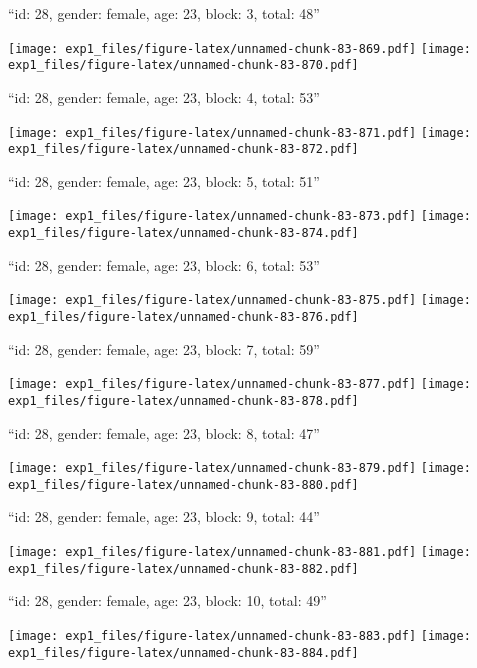\documentclass[11pt,,]{article}
\begin{document}
\newpage
[1] 

``id: 28, gender: female, age: 23, block: 3, total: 48''

\texttt{[image: exp1\_files/figure-latex/unnamed-chunk-83-869.pdf]}
\texttt{[image: exp1\_files/figure-latex/unnamed-chunk-83-870.pdf]}

\newpage
[1] 

``id: 28, gender: female, age: 23, block: 4, total: 53''

\texttt{[image: exp1\_files/figure-latex/unnamed-chunk-83-871.pdf]}
\texttt{[image: exp1\_files/figure-latex/unnamed-chunk-83-872.pdf]}

\newpage
[1] 

``id: 28, gender: female, age: 23, block: 5, total: 51''

\texttt{[image: exp1\_files/figure-latex/unnamed-chunk-83-873.pdf]}
\texttt{[image: exp1\_files/figure-latex/unnamed-chunk-83-874.pdf]}

\newpage
[1] 

``id: 28, gender: female, age: 23, block: 6, total: 53''

\texttt{[image: exp1\_files/figure-latex/unnamed-chunk-83-875.pdf]}
\texttt{[image: exp1\_files/figure-latex/unnamed-chunk-83-876.pdf]}

\newpage
[1] 

``id: 28, gender: female, age: 23, block: 7, total: 59''

\texttt{[image: exp1\_files/figure-latex/unnamed-chunk-83-877.pdf]}
\texttt{[image: exp1\_files/figure-latex/unnamed-chunk-83-878.pdf]}

\newpage
[1] 

``id: 28, gender: female, age: 23, block: 8, total: 47''

\texttt{[image: exp1\_files/figure-latex/unnamed-chunk-83-879.pdf]}
\texttt{[image: exp1\_files/figure-latex/unnamed-chunk-83-880.pdf]}

\newpage
[1] 

``id: 28, gender: female, age: 23, block: 9, total: 44''

\texttt{[image: exp1\_files/figure-latex/unnamed-chunk-83-881.pdf]}
\texttt{[image: exp1\_files/figure-latex/unnamed-chunk-83-882.pdf]}

\newpage
[1] 

``id: 28, gender: female, age: 23, block: 10, total: 49''

\texttt{[image: exp1\_files/figure-latex/unnamed-chunk-83-883.pdf]}
\texttt{[image: exp1\_files/figure-latex/unnamed-chunk-83-884.pdf]}
\end{document}
